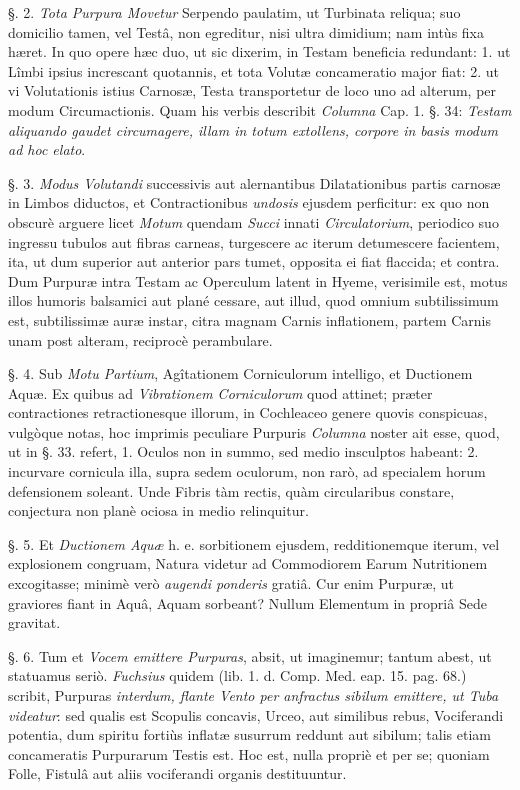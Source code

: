 \documentclass[a4paper, 11pt, oneside, polutonikogreek, german]{article}
\begin{document}
§. 2. \emph{Tota Purpura Movetur} Serpendo paulatim, ut Turbinata reliqua; suo domicilio tamen, vel Testâ, non egreditur, nisi ultra dimidium; nam intùs fixa hæret. In quo opere hæc duo, ut sic dixerim, in Testam beneficia redundant: 1. ut Lîmbi ipsius increscant quotannis, et tota Volutæ concameratio major fiat: 2. ut vi Volutationis istius Carnosæ, Testa transportetur de loco uno ad alterum, per modum Circumactionis. Quam his verbis describit \emph{Columna} Cap. 1. §. 34: \emph{Testam aliquando gaudet circumagere, illam in totum extollens, corpore in basis modum ad hoc elato}.

§. 3. \emph{Modus Volutandi} successivis aut alernantibus Dilatationibus partis carnosæ in Limbos diductos, et Contractionibus \emph{undosis} ejusdem perficitur: ex quo non obscurè arguere licet \emph{Motum} quendam \emph{Succi} innati \emph{Circulatorium}, periodico suo ingressu tubulos aut fibras carneas, turgescere ac iterum detumescere facientem, ita, ut dum superior aut anterior pars tumet, opposita ei fiat flaccida; et contra. Dum Purpuræ intra Testam ac Operculum latent in Hyeme, verisimile est, motus illos humoris balsamici aut plané cessare, aut illud, quod omnium subtilissimum est, subtilissimæ auræ instar, citra magnam Carnis inflationem, partem Carnis unam post alteram, reciprocè perambulare.

§. 4. Sub \emph{Motu Partium}, Agîtationem Corniculorum intelligo, et Ductionem Aquæ. Ex quibus ad \emph{Vibrationem Corniculorum} quod attinet; præter contractiones retractionesque illorum, in Cochleaceo genere quovis conspicuas, vulgòque notas, hoc imprimis peculiare Purpuris \emph{Columna} noster ait esse, quod, ut in §. 33. refert, 1. Oculos non in summo, sed medio insculptos habeant: 2. incurvare cornicula illa, supra sedem oculorum, non rarò, ad specialem horum defensionem soleant. Unde Fibris tàm rectis, quàm circularibus constare, conjectura non planè ociosa in medio relinquitur.

§. 5. Et \emph{Ductionem Aquæ} h. e. sorbitionem ejusdem, redditionemque iterum, vel explosionem congruam, Natura videtur ad Commodiorem Earum Nutritionem excogitasse; minimè verò \emph{augendi ponderis} gratiâ. Cur enim Purpuræ, ut graviores fiant in Aquâ, Aquam sorbeant? Nullum Elementum in propriâ Sede gravitat.

§. 6. Tum et \emph{Vocem emittere Purpuras}, absit, ut imaginemur; tantum abest, ut statuamus seriò. \emph{Fuchsius} quidem (lib. 1. d. Comp. Med. eap. 15. pag. 68.) scribit, Purpuras \emph{interdum, flante Vento per anfractus sibilum emittere, ut Tuba videatur}: sed qualis est Scopulis concavis, Urceo, aut similibus rebus, Vociferandi potentia, dum spiritu fortiùs inflatæ susurrum reddunt aut sibilum; talis etiam concameratis Purpurarum Testis est. Hoc est, nulla propriè et per se; quoniam Folle, Fistulâ aut aliis vociferandi organis destituuntur.
\end{document}
